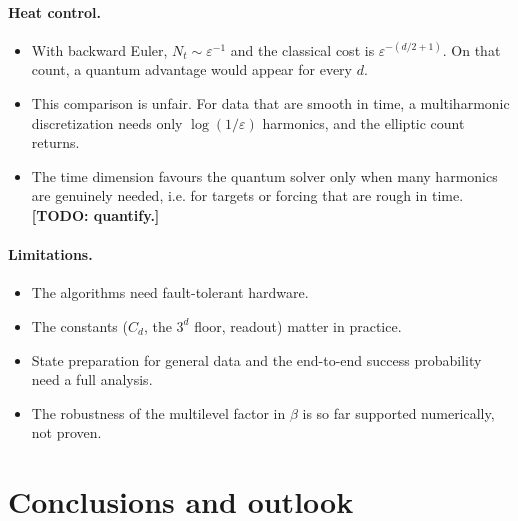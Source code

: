 \documentclass[11pt,a4paper]{article}
\newcommand{\todo}[1]{\textbf{[TODO: #1]}}
\theoremstyle{remark}
\begin{document}
\paragraph{Heat control.}
\begin{itemize}
\item With backward Euler, $N_t\sim\varepsilon^{-1}$ and the classical cost is
  $\varepsilon^{-(d/2+1)}$. On that count, a quantum advantage would appear for
  every $d$.
\item This comparison is unfair. For data that are smooth in time, a
  multiharmonic discretization needs only $\log(1/\varepsilon)$ harmonics, and the
  elliptic count returns.
\item The time dimension favours the quantum solver only when many
  harmonics are genuinely needed, i.e. for targets or forcing that are rough
  in time. \todo{quantify.}
\end{itemize}

\paragraph{Limitations.}
\begin{itemize}
\item The algorithms need fault-tolerant hardware.
\item The constants ($C_d$, the $3^d$ floor, readout) matter in practice.
\item State preparation for general data and the end-to-end success
  probability need a full analysis.
\item The robustness of the multilevel factor in $\beta$ is so far supported
  numerically, not proven.
\end{itemize}

\section{Conclusions and outlook}\label{sec:conclusions}
\end{document}
